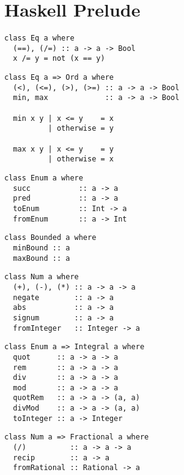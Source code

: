 \cleardoublepage
\chapter{Haskell Prelude}
\renewcommand{\haskellIn}[1]{\texttt{#1}}

\begin{multicols}{2}\scriptsize 
\begin{verbatim}
class Eq a where
  (==), (/=) :: a -> a -> Bool
  x /= y = not (x == y)
\end{verbatim}
	
\begin{verbatim}
class Eq a => Ord a where
  (<), (<=), (>), (>=) :: a -> a -> Bool
  min, max             :: a -> a -> Bool

  min x y | x <= y    = x
          | otherwise = y

  max x y | x <= y    = y
          | otherwise = x
\end{verbatim}
	
\begin{verbatim}
class Enum a where
  succ           :: a -> a 
  pred           :: a -> a
  toEnum         :: Int -> a
  fromEnum       :: a -> Int 
\end{verbatim}
	
\begin{verbatim}
class Bounded a where
  minBound :: a 
  maxBound :: a
\end{verbatim}
	
\begin{verbatim}
class Num a where 
  (+), (-), (*) :: a -> a -> a
  negate        :: a -> a
  abs           :: a -> a
  signum        :: a -> a
  fromInteger   :: Integer -> a
\end{verbatim}
	
\begin{verbatim}
class Enum a => Integral a where 
  quot      :: a -> a -> a
  rem       :: a -> a -> a
  div       :: a -> a -> a
  mod       :: a -> a -> a
  quotRem   :: a -> a -> (a, a)
  divMod    :: a -> a -> (a, a)
  toInteger :: a -> Integer
\end{verbatim}
	
\begin{verbatim}
class Num a => Fractional a where
  (/)          :: a -> a -> a
  recip        :: a -> a
  fromRational :: Rational -> a
\end{verbatim}
	

\end{multicols}
